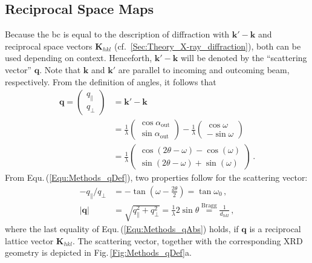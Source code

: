 \subsection{Reciprocal Space Maps}
    \label{Sec:Methods_RSM}
Because the \gls{bc} is equal to the description of diffraction with $\mathbf{k}'-\mathbf{k}$ and reciprocal space vectors $\mathbf{K}_{hkl}$ (cf.~\ref{Sec:Theory_X-ray_diffraction}), both can be used depending on context.
Henceforth, $\mathbf{k}'-\mathbf{k}$ will be denoted by the \enquote{scattering vector} $\mathbf{q}$.
Note that $\mathbf{k}$ and $\mathbf{k}'$ are parallel to incoming and outcoming beam, respectively.
From the definition of angles, it follows that
\begin{align}
    \mathbf{q}
    =\begin{pmatrix}
        q_\parallel\\
        q_\perp
    \end{pmatrix}
    &=\mathbf{k}'-\mathbf{k}\\
    &=\frac{1}{\lambda}
    \begin{pmatrix}
        \cos\alpha_\mathrm{out}\\
        \sin\alpha_\mathrm{out}
    \end{pmatrix}
    -\frac{1}{\lambda}
    \begin{pmatrix}
        \cos\omega\\
        -\sin\omega
    \end{pmatrix}\\
    &=\frac{1}{\lambda}
    \begin{pmatrix}
        \cos(2\theta-\omega)-\cos(\omega)\\
        \sin(2\theta-\omega)+\sin(\omega)
    \end{pmatrix}\,.
    \label{Equ:Methods_qDef}
\end{align}
From Equ.\,(\ref{Equ:Methods_qDef}), two properties follow for the scattering vector:
\begin{align}
    -q_\parallel/q_\perp&=-\tan\left(\omega-\frac{2\theta}{2}\right)=\tan\omega_0
        \label{Equ:Methods_qDir}\,,\\
    \left|\mathbf{q}\right|&=\sqrt{q_\parallel^2+q_\perp^2}=\frac{1}{\lambda}2\sin\theta\overset{\mathrm{Bragg}}{=}\frac{1}{d_{hkl}}\,,
    \label{Equ:Methods_qAbs}
\end{align}
where the last equality of Equ.\,(\ref{Equ:Methods_qAbs}) holds, if $\mathbf{q}$ is a reciprocal lattice vector $\mathbf{K}_{hkl}$.
The scattering vector, together with the corresponding \gls{XRD} geometry is depicted in Fig.\,\ref{Fig:Methods_qDef}a.
